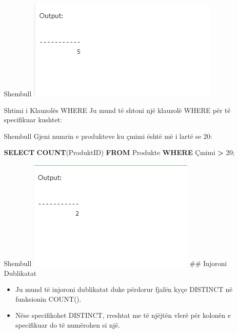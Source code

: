 \documentclass[
  ignorenonframetext,
]{beamer}
\newenvironment{Shaded}{\begin{snugshade}}{\end{snugshade}}
\newcommand{\DecValTok}[1]{\textcolor[rgb]{0.00,0.00,0.81}{#1}}
\newcommand{\FunctionTok}[1]{\textcolor[rgb]{0.13,0.29,0.53}{\textbf{#1}}}
\newcommand{\KeywordTok}[1]{\textcolor[rgb]{0.13,0.29,0.53}{\textbf{#1}}}
\newcommand{\NormalTok}[1]{#1}
\newcommand{\OperatorTok}[1]{\textcolor[rgb]{0.81,0.36,0.00}{\textbf{#1}}}
\begin{document}
\begin{frame}{Shembull}
\label{shembull-26}
\includegraphics{./Figs/query46.png}
\end{frame}

\begin{frame}{Shtimi i Klauzolës WHERE}
\label{shtimi-i-klauzoluxebs-where-2}
Ju mund të shtoni një klauzolë WHERE për të specifikuar kushtet:
\end{frame}

\begin{frame}[fragile]{Shembull}
\label{shembull-27}
Gjeni numrin e produkteve ku çmimi është më i lartë se 20:


\begin{Shaded}
\begin{Highlighting}[]
\KeywordTok{SELECT} \FunctionTok{COUNT}\NormalTok{(ProduktID)}
\KeywordTok{FROM}\NormalTok{ Produkte}
\KeywordTok{WHERE}\NormalTok{ Çmimi }\OperatorTok{\textgreater{}} \DecValTok{20}\NormalTok{;}
\end{Highlighting}
\end{Shaded}
\end{frame}

\begin{frame}{Shembull}
\label{shembull-28}
\includegraphics{./Figs/query47.png} \#\# Injoroni Dublikatat

\begin{itemize}
\item
  Ju mund të injoroni dublikatat duke përdorur fjalën kyçe DISTINCT në
  funksionin COUNT().
\item
  Nëse specifikohet DISTINCT, rreshtat me të njëjtën vlerë për kolonën e
  specifikuar do të numërohen si një.
\end{itemize}
\end{frame}
\end{document}
